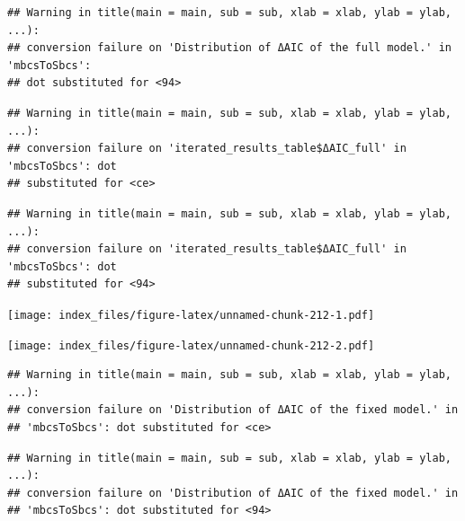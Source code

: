 \documentclass[
]{article}
\newenvironment{Shaded}{\begin{snugshade}}{\end{snugshade}}
\newcommand{\AttributeTok}[1]{\textcolor[rgb]{0.77,0.63,0.00}{#1}}
\newcommand{\FunctionTok}[1]{\textcolor[rgb]{0.00,0.00,0.00}{#1}}
\newcommand{\NormalTok}[1]{#1}
\newcommand{\SpecialCharTok}[1]{\textcolor[rgb]{0.00,0.00,0.00}{#1}}
\newcommand{\StringTok}[1]{\textcolor[rgb]{0.31,0.60,0.02}{#1}}
\begin{document}
\begin{verbatim}
## Warning in title(main = main, sub = sub, xlab = xlab, ylab = ylab, ...):
## conversion failure on 'Distribution of ΔAIC of the full model.' in 'mbcsToSbcs':
## dot substituted for <94>
\end{verbatim}

\begin{verbatim}
## Warning in title(main = main, sub = sub, xlab = xlab, ylab = ylab, ...):
## conversion failure on 'iterated_results_table$ΔAIC_full' in 'mbcsToSbcs': dot
## substituted for <ce>
\end{verbatim}

\begin{verbatim}
## Warning in title(main = main, sub = sub, xlab = xlab, ylab = ylab, ...):
## conversion failure on 'iterated_results_table$ΔAIC_full' in 'mbcsToSbcs': dot
## substituted for <94>
\end{verbatim}

\texttt{[image: index\_files/figure-latex/unnamed-chunk-212-1.pdf]}

\begin{Shaded}
\end{Shaded}

\texttt{[image: index\_files/figure-latex/unnamed-chunk-212-2.pdf]}

\begin{Shaded}
\end{Shaded}

\begin{verbatim}
## Warning in title(main = main, sub = sub, xlab = xlab, ylab = ylab, ...):
## conversion failure on 'Distribution of ΔAIC of the fixed model.' in
## 'mbcsToSbcs': dot substituted for <ce>
\end{verbatim}

\begin{verbatim}
## Warning in title(main = main, sub = sub, xlab = xlab, ylab = ylab, ...):
## conversion failure on 'Distribution of ΔAIC of the fixed model.' in
## 'mbcsToSbcs': dot substituted for <94>
\end{verbatim}
\end{document}
